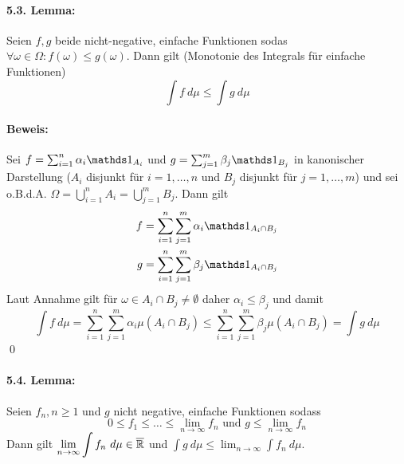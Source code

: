 \documentclass[12pt]{report}
\begin{document}
 \paragraph{5.3. Lemma:}Seien $f,g$ beide nicht-negative, einfache Funktionen sodas $\forall\omega\in\Omega:f(\omega)\leq g(\omega)$. Dann gilt (Monotonie des Integrals f\"ur einfache Funktionen)
 $$\int f\ d\mu\leq\int g\ d\mu$$
 
 \paragraph{Beweis:}Sei $f=\sum_{i=1}^n\alpha_i\ind{A_i}$ und $g=\sum_{j=1}^m\beta_j\ind{B_j}$ in kanonischer Darstellung ($A_i$ disjunkt f\"ur $i=1,\hdots,n$ und $B_j$ disjunkt f\"ur $j=1,\hdots,m$) und sei o.B.d.A. $\Omega=\bigcup_{i=1}^nA_i=\bigcup_{j=1}^mB_j$. Dann gilt 
 \begin{align*}
     f&=\sum_{i=1}^n\sum_{j=1}^m\alpha_i\ind{A_i\cap B_j}\\
     g&=\sum_{i=1}^n\sum_{j=1}^m\beta_j\ind{A_i\cap B_j}
 \end{align*}
 Laut Annahme gilt f\"ur $\omega\in A_i\cap B_j\neq\emptyset$ daher $\alpha_i\leq\beta_j$ und damit
 $$\int f\ d\mu=\sum_{i=1}^n\sum_{j=1}^m\alpha_i\mu(A_i\cap B_j)\leq\sum_{i=1}^n\sum_{j=1}^m\beta_j\mu(A_i\cap B_j)=\int g\ d\mu$$
 \qed
 
 \paragraph{5.4. Lemma:}Seien $f_n,n\geq1$ und $g$ nicht negative, einfache Funktionen sodass
 $$0\leq f_1\leq\hdots\leq\lim_{n\to\infty}f_n\text{ und }g\leq\lim_{n\to\infty}f_n$$
 Dann gilt $\displaystyle\lim_{n\to\infty}\int f_n\ d\mu\in\overline{\mathbb{R}}$ und $\displaystyle\int g \ d\mu\leq\lim_{n\to\infty}\int f_n\ d\mu$.
 
\end{document}
